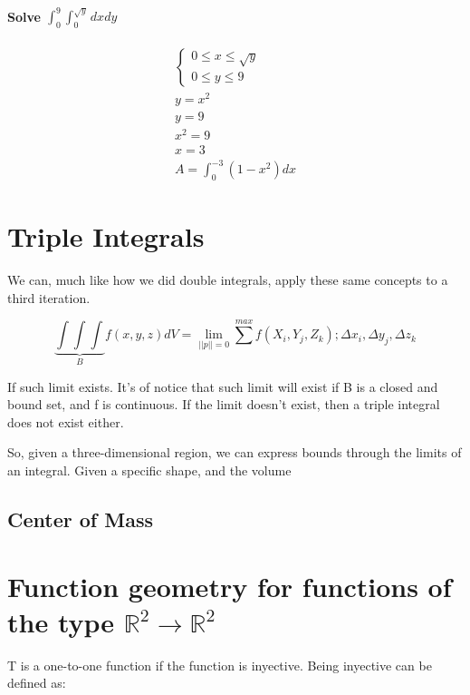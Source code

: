 \documentclass[11pt,fleqn]{book} %
\begin{document}
\paragraph*{Solve $\int_{0}^9\int_0^{\sqrt{y}} dxdy$}
\begin{gather}
    \begin{cases}
        0 \leq x \leq \sqrt{y} \\
        0 \leq y \leq 9
    \end{cases} \\
    y = x^2 \\
    y = 9 \\
    x^2 = 9 \\
    x = 3 \\
    A = \int_0^{-3} (1-x^2) dx
\end{gather}

\section{Triple Integrals}

We can, much like how we did double integrals, apply these same concepts to a third iteration.

\begin{equation}
    \underbrace{\int\int\int}_{B} f(x,y,z) dV = \lim_{||p|| = 0} \sum_{}^{max} f(X_i,Y_j,Z_k); \Delta x_i, \Delta y_j, \Delta z_k
\end{equation}

If such limit exists. It's of notice that such limit will exist if B is a closed and bound set, and f is continuous.
If the limit doesn't exist, then a triple integral does not exist either.

So, given a three-dimensional region, we can express bounds through the limits of an integral.
Given a specific shape, and the volume 

\subsection{Center of Mass}



\section{Function geometry for functions of the type $\mathbb{R}^2 \to \mathbb{R}^2$}

T is a one-to-one function if the function is inyective. Being inyective can be defined as:
\end{document}

